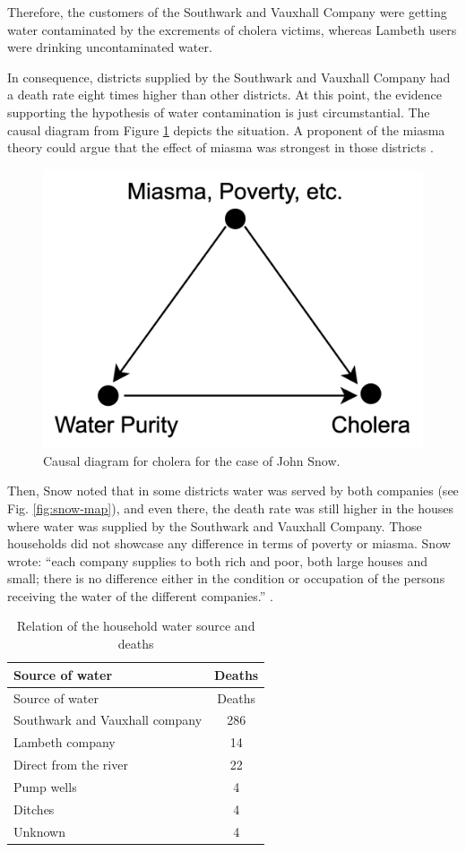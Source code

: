 \documentclass[
]{book}
\begin{document}
Therefore, the customers of the Southwark and Vauxhall Company were getting water contaminated by the excrements of cholera victims, whereas Lambeth users were drinking uncontaminated water.

In consequence, districts supplied by the Southwark and Vauxhall Company had a death rate eight times higher than other districts. At this point, the evidence supporting the hypothesis of water contamination is just circumstantial. The causal diagram from Figure \ref{fig:snow-dia-A} depicts the situation. A proponent of the miasma theory could argue that the effect of miasma was strongest in those districts \citep{book-of-why}.

\begin{figure}

{\centering \includegraphics[width=0.33\linewidth]{Figures/SnowDiagramA} 

}

\caption{Causal diagram for cholera for the case of John Snow.}\label{fig:snow-dia-A}
\end{figure}

Then, Snow noted that in some districts water was served by both companies (see Fig. \ref{fig:snow-map}), and even there, the death rate was still higher in the houses where water was supplied by the Southwark and Vauxhall Company. Those households did not showcase any difference in terms of poverty or miasma. Snow wrote: ``each company supplies to both rich and poor, both large houses and small; there is no difference either in the condition or occupation of the persons receiving the water of the different companies.'' \citep{book-of-why}.

\begin{longtable}[]{@{}lc@{}}
\caption{Relation of the household water source and deaths}\tabularnewline
\toprule()
Source of water & Deaths \\
\midrule()
\endfirsthead
\toprule()
Source of water & Deaths \\
\midrule()
\endhead
Southwark and Vauxhall company & 286 \\
Lambeth company & 14 \\
Direct from the river & 22 \\
Pump wells & 4 \\
Ditches & 4 \\
Unknown & 4 \\
\bottomrule()
\end{longtable}
\end{document}
